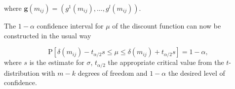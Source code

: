 where $\bm{g}(m_{ij})= \left(g^1(m_{ij}), \dots, g^l(m_{ij}) \right)$.

The $1- \alpha$ confidence interval for $\mu$ of the discount function can now be constructed in the usual way

\begin{equation*}
\label{eq:cint}
\mbox{P}\left[ \delta(m_{ij}) - t_{\alpha / 2} s   \leq \mu  \leq \delta(m_{ij})  + t_{\alpha / 2} s\right]= 1 - \alpha,
\end{equation*} 
where $s$ is the estimate for $\sigma$, $t_{\alpha / 2}$ the appropriate critical value from the $t$-distribution with $m-k$ degrees of freedom and $1-\alpha$ the desired level of confidence. 


